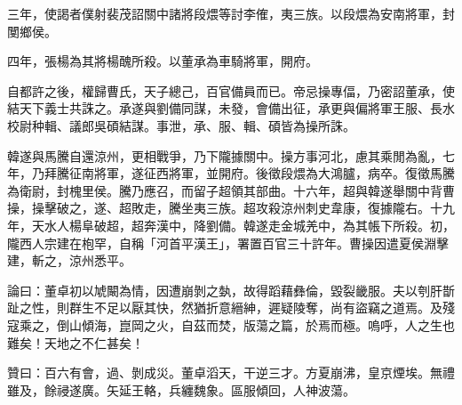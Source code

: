 \begin{pinyinscope}
三年，使謁者僕射裴茂詔關中諸將段煨等討李傕，夷三族。以段煨為安南將軍，封閺鄉侯。

四年，張楊為其將楊醜所殺。以董承為車騎將軍，開府。

自都許之後，權歸曹氏，天子總己，百官備員而已。帝忌操專偪，乃密詔董承，使結天下義士共誅之。承遂與劉備同謀，未發，會備出征，承更與偏將軍王服、長水校尉种輯、議郎吳碩結謀。事泄，承、服、輯、碩皆為操所誅。

韓遂與馬騰自還涼州，更相戰爭，乃下隴據關中。操方事河北，慮其乘閒為亂，七年，乃拜騰征南將軍，遂征西將軍，並開府。後徵段煨為大鴻臚，病卒。復徵馬騰為衛尉，封槐里侯。騰乃應召，而留子超領其部曲。十六年，超與韓遂舉關中背曹操，操擊破之，遂、超敗走，騰坐夷三族。超攻殺涼州刺史韋康，復據隴右。十九年，天水人楊阜破超，超奔漢中，降劉備。韓遂走金城羌中，為其帳下所殺。初，隴西人宗建在枹罕，自稱「河首平漢王」，署置百官三十許年。曹操因遣夏侯淵擊建，斬之，涼州悉平。

論曰：董卓初以虓闞為情，因遭崩剝之埶，故得蹈藉彝倫，毀裂畿服。夫以刳肝斮趾之性，則群生不足以厭其快，然猶折意縉紳，遲疑陵奪，尚有盜竊之道焉。及殘寇乘之，倒山傾海，崑岡之火，自茲而焚，版蕩之篇，於焉而極。嗚呼，人之生也難矣！天地之不仁甚矣！

贊曰：百六有會，過、剝成災。董卓滔天，干逆三才。方夏崩沸，皇京煙埃。無禮雖及，餘祲遂廣。矢延王輅，兵纏魏象。區服傾回，人神波蕩。


\end{pinyinscope}